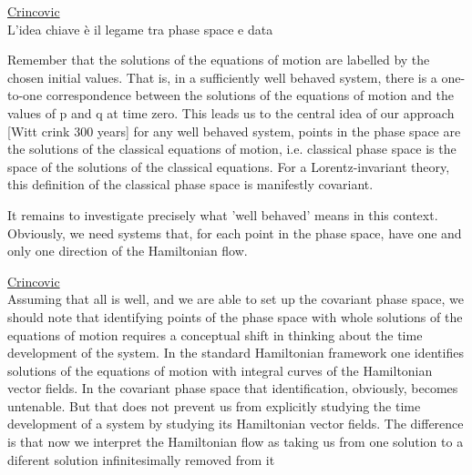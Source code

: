 \documentclass[Cascione]{subfiles}
\begin{document}
		\begin{Warning}
			\underline{Crincovic}\cite{Crnkovic1999}\\
			L'idea chiave è il legame tra phase space e data
			
			Remember that the solutions of the equations of motion are labelled by the chosen initial values. 
			That is, in a sufficiently well behaved system, there is a one-to-one correspondence between the solutions of the equations of motion and the values of p and q at time zero. 
			This leads us to the central idea of our approach [Witt crink 300 years] for any well behaved system, points in the phase space are the solutions of the classical equations of motion, i.e. classical phase space is the space of the solutions of the classical equations. For a Lorentz-invariant theory, this definition of the classical phase space is manifestly covariant.		
			
			It remains to investigate precisely what 'well behaved' means in this context.
			Obviously, we need systems that, for each point in the phase space, have one and only one direction of the Hamiltonian flow.
		\end{Warning}	
		
		\begin{Warning}
		\underline{Crincovic}\cite{Crnkovic1999}\\
		Assuming that all is well, and we are able to set up the covariant phase space, we should note that identifying points of the phase space with whole solutions of the equations of motion requires a conceptual shift in thinking about the time development of the system.
		In the standard Hamiltonian framework one identifies solutions of the equations of motion with integral curves of the Hamiltonian vector fields. 
		In the covariant phase space that identification, obviously, becomes untenable. But that does not prevent us from explicitly studying the time development of a system by studying its Hamiltonian vector fields. 
		The difference is that now we interpret the Hamiltonian flow as taking us from one solution to a diferent solution infinitesimally removed from it	
		\end{Warning}
\end{document}
